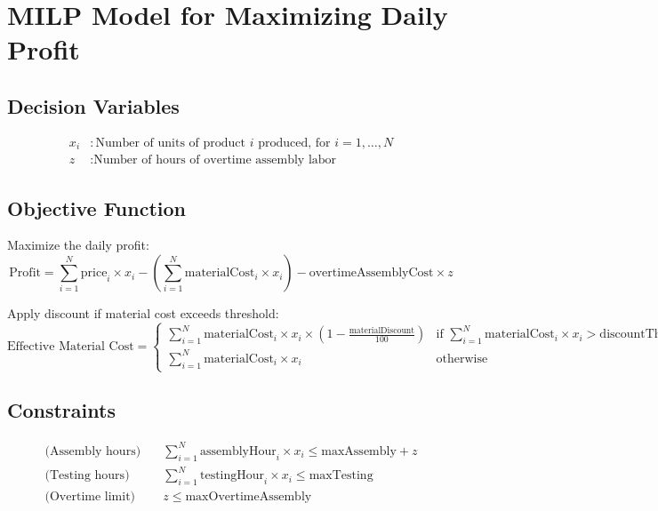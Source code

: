 \documentclass{article}
\begin{document}
\section*{MILP Model for Maximizing Daily Profit}

\subsection*{Decision Variables}
\begin{align*}
x_i & : \text{Number of units of product } i \text{ produced, for } i = 1, \ldots, N \\
z & : \text{Number of hours of overtime assembly labor}
\end{align*}

\subsection*{Objective Function}
Maximize the daily profit:
\[
\text{Profit} = \sum_{i=1}^{N} \text{price}_i \times x_i - \left( \sum_{i=1}^{N} \text{materialCost}_i \times x_i \right) - \text{overtimeAssemblyCost} \times z
\]

Apply discount if material cost exceeds threshold:
\[
\text{Effective Material Cost} = 
\begin{cases} 
\sum_{i=1}^{N} \text{materialCost}_i \times x_i \times \left(1 - \frac{\text{materialDiscount}}{100} \right) & \text{if } \sum_{i=1}^{N} \text{materialCost}_i \times x_i > \text{discountThreshold} \\
\sum_{i=1}^{N} \text{materialCost}_i \times x_i & \text{otherwise}
\end{cases}
\]

\subsection*{Constraints}
\begin{align}
\text{(Assembly hours)} & \quad \sum_{i=1}^{N} \text{assemblyHour}_i \times x_i \leq \text{maxAssembly} + z \\
\text{(Testing hours)} & \quad \sum_{i=1}^{N} \text{testingHour}_i \times x_i \leq \text{maxTesting} \\
\text{(Overtime limit)} & \quad z \leq \text{maxOvertimeAssembly}
\end{align}
\end{document}
